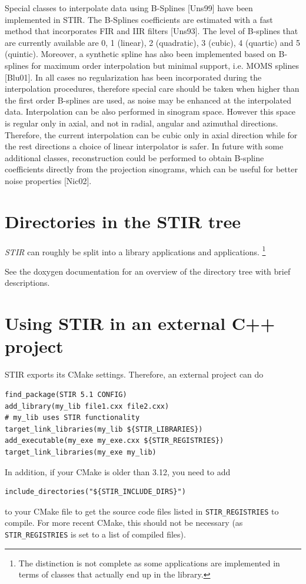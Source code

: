 \documentclass{article}
\begin{document}
{{{{{{\label{sec:BSplines}
Special classes to interpolate data using B-Splines [Uns99] have been implemented in STIR. 
The B-Splines coefficients are estimated with a fast method that incorporates FIR and IIR 
filters [Uns93]. The level of B-splines that are currently available are 0, 1 (linear), 
2 (quadratic), 3 (cubic), 4 (quartic) and 5 (quintic). Moreover, a synthetic spline has also been 
implemented based on B-splines for maximum order interpolation but minimal support, i.e. MOMS 
splines [Blu01]. In all cases no regularization has been incorporated during the interpolation 
procedures, therefore special care should be taken when higher than the first order B-splines 
are used, as noise may be enhanced at the interpolated data. Interpolation can be also performed 
in sinogram space. However this space is regular only in axial, and not in radial, angular and 
azimuthal directions. Therefore, the current interpolation can be cubic only in axial direction 
while for the rest directions a choice of linear interpolator is safer. In future with some 
additional classes, reconstruction could be performed to obtain B-spline coefficients directly 
from the projection sinograms, which can be useful for better noise properties [Nic02].

\section{
Directories in the STIR tree}
\textit{STIR} can roughly be split into a library applications and applications.
\footnote{The distinction is not complete as some applications are implemented
in terms of classes that actually end up in the library.}

See the doxygen documentation for an overview of the directory tree with brief descriptions.

\section{Using STIR in an external C++ project
\label{sec:ExternalProjectC++}}
STIR exports its CMake settings. Therefore, an external project can do
\begin{verbatim}
find_package(STIR 5.1 CONFIG)
add_library(my_lib file1.cxx file2.cxx)
# my_lib uses STIR functionality
target_link_libraries(my_lib ${STIR_LIBRARIES})
add_executable(my_exe my_exe.cxx ${STIR_REGISTRIES})
target_link_libraries(my_exe my_lib)
\end{verbatim}
In addition, if your CMake is older than 3.12, you need to add
\begin{verbatim}
include_directories("${STIR_INCLUDE_DIRS}")
\end{verbatim}
to your CMake file to get the source code files listed in \texttt{STIR\_REGISTRIES} to compile.
For more recent CMake, this should not be necessary (as \texttt{STIR\_REGISTRIES} is set to
a list of compiled files).

}}}}}}
\end{document}
